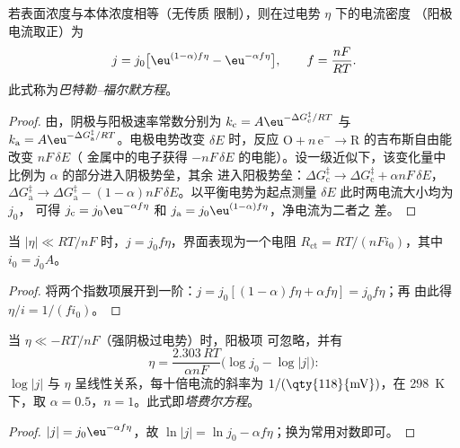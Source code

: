 \begin{theorem}\label{thm:b3:electrode-kinetics:butler-volmer}
若表面浓度与本体浓度相等（无传质
限制），则在过电势 $\eta$ 下的电流密度
（阳极电流取正）为
\[
  j = j_0\bigl[\eu^{(1 - \alpha)f\eta} - \eu^{-\alpha f\eta}\bigr], \qquad f = \frac{nF}{RT}.
\]
此式称为\emph{巴特勒–福尔默方程}。
\end{theorem}

\begin{proof}
由，阴极与阳极速率常数分别为
$k_{\mathrm c} = A\eu^{-\Delta G_{\mathrm c}^{\ddagger}/RT}$ 与 $k_{\mathrm a} = A\eu^{-\Delta G_{\mathrm a}^{\ddagger}/RT}$。电极电势改变 $\delta E$
时，反应 $\mathrm{O} + n\,\mathrm{e}^- \to \mathrm{R}$ 的吉布斯自由能改变 $nF\,\delta E$（
金属中的电子获得 $-nF\,\delta E$ 的电能）。设一级近似下，该变化量中
比例为 $\alpha$ 的部分进入阴极势垒，其余
进入阳极势垒：$\Delta G_{\mathrm c}^{\ddagger} \to \Delta G_{\mathrm c}^{\ddagger} + \alpha nF\,\delta E$，$\Delta G_{\mathrm a}^{\ddagger} \to \Delta G_{\mathrm a}^{\ddagger} - (1 - \alpha)nF\,\delta E$。以平衡电势为起点测量 $\delta E$
此时两电流大小均为 $j_0$，
可得 $j_{\mathrm c} = j_0\eu^{-\alpha f\eta}$ 和 $j_{\mathrm a} = j_0\eu^{(1 - \alpha)f\eta}$，净电流为二者之
差。
\end{proof}

\begin{corollary}[电荷转移电阻]\label{cor:b3:electrode-kinetics:linear}
当 $|\eta| \ll RT/nF$ 时，$j = j_0f\eta$，界面表现为一个电阻
$R_{\mathrm{ct}} = RT/(nFi_0)$，其中 $i_0 = j_0A$。
\end{corollary}

\begin{proof}
将两个指数项展开到一阶：$j = j_0[(1 - \alpha)f\eta + \alpha f\eta] = j_0f\eta$；再
由此得 $\eta/i = 1/(fi_0)$。
\end{proof}

\begin{corollary}[塔费尔方程]\label{cor:b3:electrode-kinetics:tafel}
当 $\eta \ll -RT/nF$（强阴极过电势）时，阳极项
可忽略，并有
\[
  \eta = \frac{2.303\,RT}{\alpha nF}\bigl(\log j_0 - \log|j|\bigr):
\]
$\log|j|$ 与 $\eta$ 呈线性关系，每十倍电流的斜率为 $1/(\text{\qty{118}{mV}})$，在 \qty{298}{K} 下，取 $\alpha = 0.5$，$n =
1$。此式即\emph{塔费尔方程}。
\end{corollary}

\begin{proof}
$|j| = j_0\eu^{-\alpha f\eta}$，故 $\ln|j| = \ln j_0 - \alpha f\eta$；换为常用对数即可。
\end{proof}

